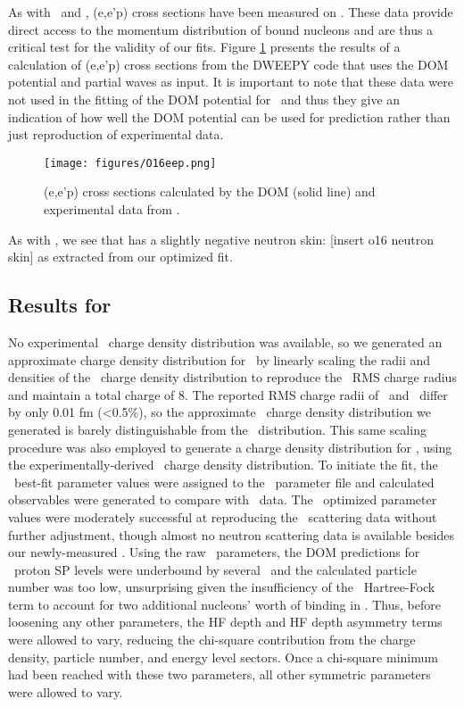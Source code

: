 As with \caForty\ and \pbEight, (e,e'p) cross sections have been measured on \oSix. These data
provide direct access to the momentum distribution of bound nucleons and are thus a critical test
for the validity of our fits. Figure \ref{O16eep} presents the results of a calculation of (e,e'p)
cross sections from the DWEEPY code \cite{Atkinson2018, Giusti2011} that uses the DOM potential and partial waves as input.
It is important to note that these data were not used in the fitting of the DOM
potential for \oSix\ and thus they give an indication of how well
the DOM potential can be used for prediction rather than just reproduction of experimental data.

\begin{figure}[tb]
    \centering
    \texttt{[image: figures/O16eep.png]}
    \caption[\oSix (e,e'p) cross sections calculated by the DOM]
    {
        \oSix (e,e'p) cross sections calculated by the DOM (solid line) and experimental data from
        \cite{Leuschner1994}.
    }
    \label{O16eep}
\end{figure}

As with \caForty, we see that \oSix has a slightly negative neutron skin: [insert o16 neutron skin]
\femto\meter as extracted from our optimized fit.

\subsection{Results for \oEight}
No experimental \oEight\ charge density distribution was available, so we generated
an approximate charge density distribution for \oEight\ by linearly scaling
the radii and densities of the \oSix\ charge density distribution to reproduce the \oEight\ RMS charge
radius and maintain a total charge of 8. The reported RMS charge radii of \oSix\ and \oEight\ differ by only
0.01 fm (<0.5\%), so the approximate \oEight\ charge density distribution we generated is barely
distinguishable from the \oSix\ distribution. This same scaling procedure was also employed to
generate a charge density distribution for \snTwelve, using the
experimentally-derived \snFour\ charge density distribution. To initiate the fit, the \oSix\ best-fit parameter values
were assigned to the \oEight\ parameter file and calculated observables were generated to compare
with \oEight\ data. The \oSix\ optimized parameter values were moderately successful at reproducing
the \oEight\ scattering data without further adjustment, though almost no neutron scattering data is
available besides our newly-measured \tot. Using the raw \oSix\ parameters, the DOM predictions for
\oEight\ proton SP levels were underbound by several \mega\electronvolt\
and the calculated particle number was too low, unsurprising
given the insufficiency of the \oSix\ Hartree-Fock term to account for 
two additional nucleons' worth of binding in \oEight. Thus, before
loosening any other parameters, the HF depth and HF depth asymmetry terms were allowed to vary,
reducing the chi-square contribution from the charge density, particle number, and energy level
sectors. Once a chi-square minimum had been reached with these two parameters, all other symmetric 
parameters were allowed to vary.

